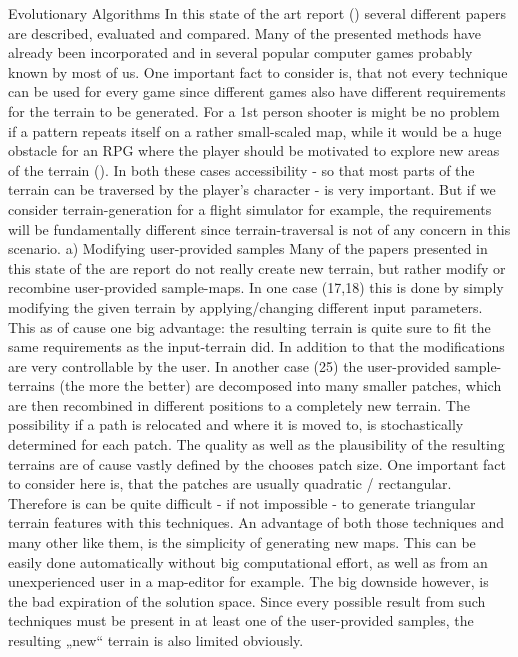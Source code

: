 Evolutionary Algorithms
In this state of the art report () several different papers are described, evaluated and compared. Many of the presented methods have already been incorporated and in several popular computer games probably known by most of us. One important fact to consider is, that not every technique can be used for every game since different games also have different requirements for the terrain to be generated. For a 1st person shooter is might be no problem if a pattern repeats itself on a rather small-scaled map, while it would be a huge obstacle for an RPG where the player should be motivated to explore new areas of the terrain (). In both these cases accessibility - so that most parts of the terrain can be traversed by the player’s character - is very important. But if we consider terrain-generation for a flight simulator for example, the requirements will be fundamentally different since terrain-traversal is not of any concern in this scenario.
a) Modifying user-provided samples
Many of the papers presented in this state of the are report do not really create new terrain, but rather modify or recombine user-provided sample-maps. In one case (17,18) this is done by simply modifying the given terrain by applying/changing different input parameters. This as of cause one big advantage: the resulting terrain is quite sure to fit the same requirements as the input-terrain did. In addition to that the modifications are very controllable by the user.
In another case (25) the user-provided sample-terrains (the more the better) are decomposed into many smaller patches, which are then recombined in different positions to a completely new terrain. The possibility if a path is relocated and where it is moved to, is stochastically determined for each patch. The quality as well as the plausibility of the resulting terrains are of cause vastly defined by the chooses patch size. One important fact to consider here is, that the patches are usually quadratic / rectangular. Therefore is can be quite difficult - if not impossible - to generate triangular terrain features with this techniques.
An advantage of both those techniques and many other like them, is the simplicity of generating new maps. This can be easily done automatically without big computational effort, as well as from an unexperienced user in a map-editor for example. The big downside however, is the bad expiration of the solution space. Since every possible result from such techniques must be present in at least one of the user-provided samples, the resulting „new“ terrain is also limited obviously.
